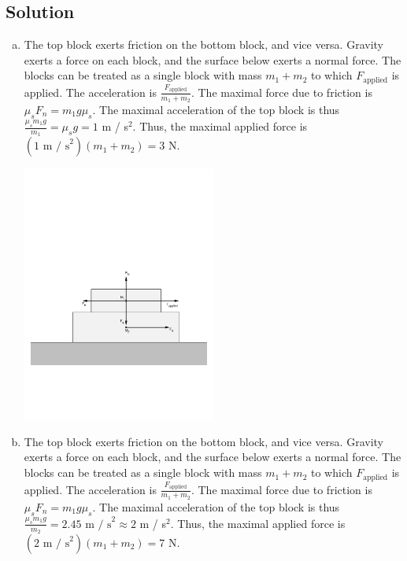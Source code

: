 \documentclass{esg8012pset}
\begin{document}
\begin{question}[Problem 2]
\subsection*{Solution}
\begin{enumerate}[a)]
  \item The top block exerts friction on the bottom block, and vice versa.  Gravity exerts a force on each block, and the surface below exerts a normal force.  The blocks can be treated as a single block with mass $m_1 + m_2$ to which $F_{\text{applied}}$ is applied.  The acceleration is $\frac{F_{\text{applied}}}{m_1 + m_2}$.  The maximal force due to friction is $\mu_s F_n = m_1 g \mu_s$.  The maximal acceleration of the top block is thus $\frac{\mu_s m_1 g}{m_1} = \mu_s g = 1$ m / s$^2$.  Thus, the maximal applied force is $(1\text{ m / s}^2)(m_1 + m_2) = 3$ N.
    \par\begin{center}\includegraphics[width=0.5\textwidth]{2009-09-25_Diagram_2}\end{center}
  \item The top block exerts friction on the bottom block, and vice versa.  Gravity exerts a force on each block, and the surface below exerts a normal force.  The blocks can be treated as a single block with mass $m_1 + m_2$ to which $F_{\text{applied}}$ is applied.  The acceleration is $\frac{F_{\text{applied}}}{m_1 + m_2}$.  The maximal force due to friction is $\mu_s F_n = m_1 g \mu_s$.  The maximal acceleration of the top block is thus $\frac{\mu_s m_1 g}{m_2} = 2.45\text{ m / s}^2\approx 2$ m / s$^2$.  Thus, the maximal applied force is $(2\text{ m / s}^2)(m_1 + m_2) = 7$ N.

\end{enumerate}
\end{question}
\end{document}
